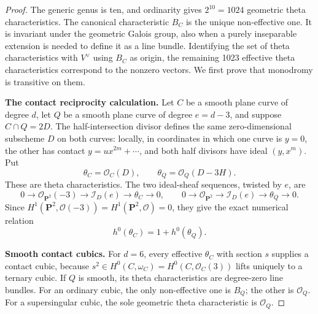 \begin{proof}
The generic genus is ten, and ordinarity gives $2^{10}=1024$
geometric theta characteristics.  The canonical characteristic $B_C$
is the unique non-effective one.  It is invariant under the
geometric Galois group, also when a purely inseparable extension is
needed to define it as a line bundle.  Identifying the set of theta
characteristics with $V^\vee$ using $B_C$ as origin, the remaining
1023 effective theta characteristics correspond to the nonzero
vectors.  We first prove that monodromy is transitive on them.

\par\smallskip\noindent\textbf{The contact reciprocity calculation.}
Let $C$ be a smooth plane curve of degree $d$, let $Q$ be a smooth
plane curve of degree $e=d-3$, and suppose $C\cap Q=2D$.
The half-intersection divisor defines the same zero-dimensional
subscheme $D$ on both curves: locally, in coordinates in which one
curve is $y=0$, the other has contact $y=u x^{2m}+\cdots$, and both
half divisors have ideal $(y,x^m)$.
Put
\[
 \theta_C=\mathcal O_C(D),\qquad
 \theta_Q=\mathcal O_Q(D-3H).
\]
These are theta characteristics.  The two ideal-sheaf sequences,
twisted by $e$, are
\[
 0\to\mathcal O_{\mathbf P^2}(-3)\to\mathcal I_D(e)
       \to\theta_C\to0,
 \qquad
 0\to\mathcal O_{\mathbf P^2}\to\mathcal I_D(e)
       \to\theta_Q\to0.
\]
Since $H^1(\mathbf P^2,\mathcal O(-3))=H^1(\mathbf P^2,\mathcal O)=0$,
they give the exact numerical relation
\begin{equation}\label{eq:contact-reciprocity}
 h^0(\theta_C)=1+h^0(\theta_Q).
\end{equation}

\par\smallskip\noindent\textbf{Smooth contact cubics.}
For $d=6$, every effective $\theta_C$ with section $s$ supplies a
contact cubic, because $s^2\in H^0(C,\omega_C)=H^0(C,\mathcal O_C(3))$
lifts uniquely to a ternary cubic.
If $Q$ is smooth, its theta characteristics are degree-zero line
bundles.  For an ordinary cubic, the only non-effective one is $B_Q$;
the other is $\mathcal O_Q$.  For a supersingular cubic, the sole
geometric theta characteristic is $\mathcal O_Q$.


\end{proof}
